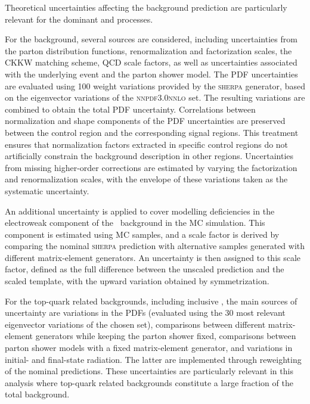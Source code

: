 Theoretical uncertainties affecting the background prediction are particularly relevant for the dominant \ztautau and \ttbar processes.  

For the \ztautau background, several sources are considered, including uncertainties from the parton distribution functions, renormalization and factorization scales, the CKKW matching scheme, QCD scale factors, as well as uncertainties associated with the underlying event and the parton shower model. The PDF uncertainties are evaluated using 100 weight variations provided by the \textsc{sherpa} generator, based on the eigenvector variations of the \textsc{nnpdf3.0nnlo} set. The resulting variations are combined to obtain the total PDF uncertainty. 
Correlations between normalization and shape components of the PDF uncertainties are preserved between the \ztautau control region and the corresponding signal regions. This treatment ensures that normalization factors extracted in specific control regions do not artificially constrain the background description in other regions. Uncertainties from missing higher-order corrections are estimated by varying the factorization and renormalization scales, with the envelope of these variations taken as the systematic uncertainty.

An additional uncertainty is applied to cover modelling deficiencies in the electroweak component of the \ztautau\ background in the MC simulation. This component is estimated using MC samples, and a scale factor is derived by comparing the nominal \textsc{sherpa} prediction with alternative samples generated with different matrix-element generators. An uncertainty is then assigned to this scale factor, defined as the full difference between the unscaled prediction and the scaled template, with the upward variation obtained by symmetrization.  

For the top-quark related backgrounds, including inclusive \ttbar, the main sources of uncertainty are variations in the PDFs (evaluated using the 30 most relevant eigenvector variations of the chosen set), comparisons between different matrix-element generators while keeping the parton shower fixed, comparisons between parton shower models with a fixed matrix-element generator, and variations in initial- and final-state radiation. The latter are implemented through reweighting of the nominal predictions. These uncertainties are particularly relevant in this analysis where top-quark related backgrounds constitute a large fraction of the total background.


